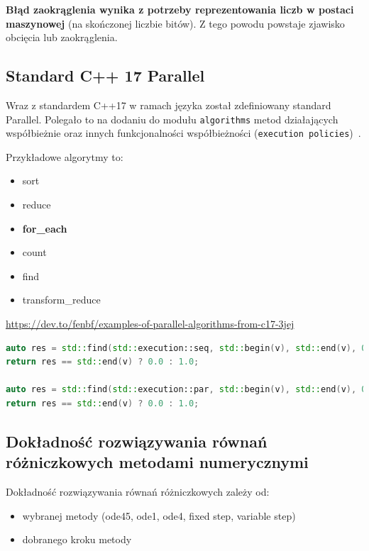 \documentclass[wi]{zut}
\begin{document}
\textbf{Błąd zaokrąglenia wynika z potrzeby reprezentowania liczb w postaci maszynowej} (na skończonej liczbie bitów). Z tego powodu powstaje zjawisko obcięcia lub zaokrąglenia.

\subsection{Standard C++ 17 Parallel}

Wraz z standardem C++17 w ramach języka został zdefiniowany standard Parallel. Polegało to na dodaniu do modułu \lstinline{algorithms} metod działających współbieżnie oraz innych funkcjonalności współbieżności (\lstinline{execution policies})~\cite{C++17}.

Przykładowe algorytmy to:

\begin{itemize}
    \item sort
    \item reduce
    \item \textbf{for\_each}
    \item count
    \item find
    \item transform\_reduce~\cite{MicrosoftCPP17}
\end{itemize}


{\url{https://dev.to/fenbf/examples-of-parallel-algorithms-from-c17-3jej}}{\label{kod:przyklad}}
\begin{lstlisting}[language=C++]
auto res = std::find(std::execution::seq, std::begin(v), std::end(v), 0.6);
return res == std::end(v) ? 0.0 : 1.0;

auto res = std::find(std::execution::par, std::begin(v), std::end(v), 0.6);
return res == std::end(v) ? 0.0 : 1.0;
\end{lstlisting}


\subsection{Dokładność rozwiązywania równań różniczkowych metodami numerycznymi}

Dokładność rozwiązywania równań różniczkowych zależy od:

\begin{itemize}
    \item wybranej metody (ode45, ode1, ode4, fixed step, variable step)
    \item dobranego kroku metody
\end{itemize}
\question
\end{document}
